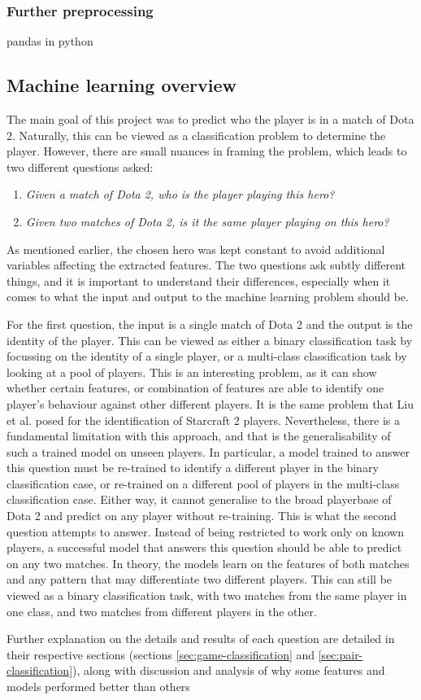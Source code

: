\documentclass[Report.tex]{subfiles}
\begin{document}
\subsubsection{Further preprocessing}
pandas in python


\subsection{Machine learning overview}
The main goal of this project was to predict who the player is in a match of Dota 2. Naturally, this can be viewed as a classification problem to determine the player. However, there are small nuances in framing the problem, which leads to two different questions asked:

\begin{enumerate}
\item \textit{Given a match of Dota 2, who is the player playing this hero?}
\item \textit{Given two matches of Dota 2, is it the same player playing on this hero?}
\end{enumerate}

As mentioned earlier, the chosen hero was kept constant to avoid additional variables affecting the extracted features. The two questions ask subtly different things, and it is important to understand their differences, especially when it comes to what the input and output to the machine learning problem should be. 

For the first question, the input is a single match of Dota 2 and the output is the identity of the player. This can be viewed as either a binary classification task by focussing on the identity of a single player, or a multi-class classification task by looking at a pool of players. This is an interesting problem, as it can show whether certain features, or combination of features are able to identify one player's behaviour against other different players. It is the same problem that Liu et al. \cite{starcraft-identification} posed for the identification of Starcraft 2 players. Nevertheless, there is a fundamental limitation with this approach, and that is the generalisability of such a trained model on unseen players. In particular, a model trained to answer this question must be re-trained to identify a different player in the binary classification case, or re-trained on a different pool of players in the multi-class classification case. Either way, it cannot generalise to the broad playerbase of Dota 2 and predict on any player without re-training. This is what the second question attempts to answer. Instead of being restricted to work only on known players, a successful model that answers this question should be able to predict on any two matches. In theory, the models learn on the features of both matches and any pattern that may differentiate two different players. This can still be viewed as a binary classification task, with two matches from the same player in one class, and two matches from different players in the other. 

Further explanation on the details and results of each question are detailed in their respective sections (sections \ref{sec:game-classification} and \ref{sec:pair-classification}), along with discussion and analysis of why some features and models performed better than others 
\end{document}
